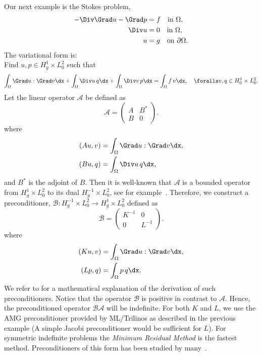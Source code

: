 Our next example is the Stokes problem,
\begin{align}
  -\Div \Grad u - \Grad p &= f \quad \mbox{in} \ \Omega, \\
  \Div u &= 0 \quad \mbox{in} \  \Omega, \\
  u &= g   \quad \mbox{on} \  \partial \Omega.
\end{align}
The variational form is: \\
Find $u,p \in H^1_g \times L_0^2$ such that
\[
\int_\Omega \Grad u : \Grad v \dx +
\int_\Omega \Div u \, q \dx +
\int_\Omega \Div v \, p \dx = \int_\Omega f\, v \dx   , \quad
\foralls v,q \in H^1_0 \times L_0^2.
\]
Let the linear operator $\mathcal{A}$ be defined as
\[
\mathcal{A}  =
\begin{pmatrix} A & B^* \\ B & 0 \end{pmatrix}.
\]
where
\begin{align}
  (A u, v) &= \int_\Omega \Grad u : \Grad v \dx, \\
  (B u, q) &= \int_\Omega \Div u \, q \dx,
\end{align}
and $B^*$ is the adjoint of $B$.  Then it is well-known that
$\mathcal{A}$ is a bounded operator from $H^1_g \times L_0^2$ to its
dual $H_g^{-1} \times L_0^2$, see for
example~\citet{Brezzi1974,BrezziFortin1991}. Therefore, we construct a
preconditioner, $\mathcal{B}: H_g^{-1} \times L_0^2 \rightarrow
H^1_g \times L_0^2$ defined as
\[
\mathcal{B}
=
\begin{pmatrix} K^{-1} & 0 \\ 0 & L^{-1} \end{pmatrix}.
\]
where
\begin{align}
  (K u, v) &= \int_\Omega \Grad u: \Grad v \dx, \\
  (L p, q) &= \int_\Omega p \, q \dx.
\end{align}
We refer to \citet{MardalWinther11} for a mathematical explanation of
the derivation of such preconditioners.  Notice that the operator
$\mathcal{B}$ is positive in contrast to $\mathcal{A}$. Hence, the
preconditioned operator $\mathcal{B} \mathcal{A}$ will be
indefinite. For both $K$ and $L$, we use the AMG preconditioner
provided by ML/Trilinos as described in the previous example (A simple
Jacobi preconditioner would be sufficient for $L$).  For symmetric
indefinite problems the \emph{Minimum Residual Method} is the fastest
method. Preconditioners of this form has been studied by
many~\citep{ElmanSilvesterWathen2005,RustenWinther1992,SilvesterWathen1993,SilvesterWathen1994}.

